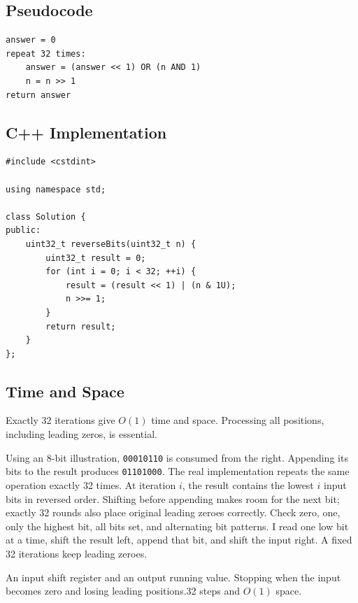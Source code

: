 \subsection{Pseudocode}
\begin{lstlisting}[style=pseudocode]
answer = 0
repeat 32 times:
    answer = (answer << 1) OR (n AND 1)
    n = n >> 1
return answer
\end{lstlisting}

\subsection{C++ Implementation}
\begin{lstlisting}[style=compactcode,caption={Complete C++ solution: Reverse Bits}]
#include <cstdint>

using namespace std;

class Solution {
public:
    uint32_t reverseBits(uint32_t n) {
        uint32_t result = 0;
        for (int i = 0; i < 32; ++i) {
            result = (result << 1) | (n & 1U);
            n >>= 1;
        }
        return result;
    }
};
\end{lstlisting}

\subsection{Time and Space}
Exactly 32 iterations give \(O(1)\) time and space. Processing all positions,
including leading zeros, is essential.

\lessonexpansion
  {Using an 8-bit illustration, \texttt{00010110} is consumed from the right.
   Appending its bits to the result produces \texttt{01101000}. The real
   implementation repeats the same operation exactly 32 times.}
  {At iteration \(i\), the result contains the lowest \(i\) input bits in
   reversed order. Shifting before appending makes room for the next bit;
   exactly 32 rounds also place original leading zeroes correctly.}
  {Check zero, one, only the highest bit, all bits set, and alternating bit
   patterns.}
  {I read one low bit at a time, shift the result left, append that bit, and
   shift the input right. A fixed 32 iterations keep leading zeroes.}

  {An input shift register and an output running value.}
  {Stopping when the input becomes zero and losing leading positions.}{32 steps and $O(1)$ space.}



